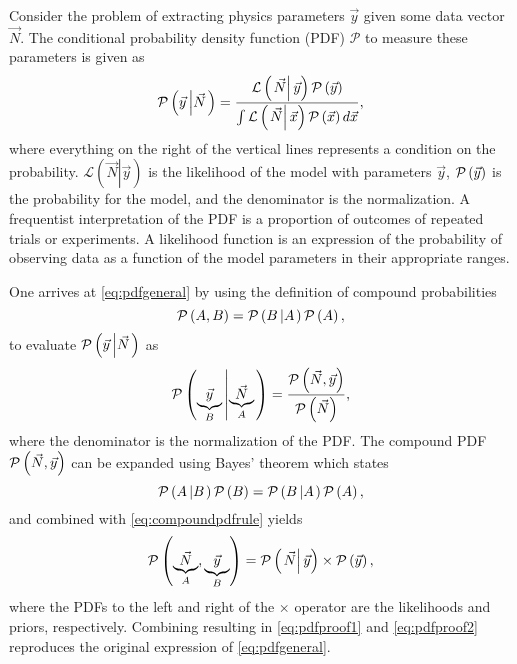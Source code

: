 Consider the problem of extracting physics parameters $\vec{y}$ given
some data vector $\vec{N}$. The conditional probability density function
(PDF) $\mathcal{P}$ to measure these parameters is given as
\begin{equation}
\mathcal{P}\left(\vec{y}\left|\vec{N}\right.\right)=\frac{\mathcal{L}\left(\left.\vec{N}\right|\vec{y}\right)\mathcal{P}\left(\vec{y}\right)}{\int\mathcal{L}\left(\left.\vec{N}\right|\vec{x}\right)\mathcal{P}\left(\vec{x}\right)d\vec{x}},\label{eq:pdfgeneral}
\end{equation}
where everything on the right of the vertical lines represents a condition
on the probability. $\mathcal{L}\left(\left.\vec{N}\right|\vec{y}\right)$
is the likelihood of the model with parameters $\vec{y}$, $\mathcal{P}\left(\vec{y}\right)$
is the probability for the model, and the denominator is the normalization.
A frequentist interpretation of the PDF is a proportion of outcomes
of repeated trials or experiments. A likelihood function is an expression
of the probability of observing data as a function of the model parameters
in their appropriate ranges.

One arrives at \eqref{eq:pdfgeneral} by using the definition of compound
probabilities
\begin{equation}
\mathcal{P}\left(A,B\right)=\mathcal{P}\left(B\left|A\right.\right)\mathcal{P}\left(A\right),\label{eq:compoundpdfrule}
\end{equation}
to evaluate $\mathcal{P}\left(\vec{y}\left|\vec{N}\right.\right)$ as
\begin{equation}
\mathcal{P}\left(\underset{B}{\underbrace{\vec{y}}}\left|\underset{A}{\underbrace{\vec{N}}}\right.\right)=\frac{\mathcal{P}\left(\vec{N},\vec{y}\right)}{\mathcal{P}\left(\vec{N}\right)},\label{eq:pdfproof1}
\end{equation}
where the denominator is the normalization of the PDF. The compound
PDF $\mathcal{P}\left(\vec{N},\vec{y}\right)$ can be expanded using Bayes' theorem
which states
\begin{equation}
\mathcal{P}\left(A\left|B\right.\right)\mathcal{P}\left(B\right)=\mathcal{P}\left(B\left|A\right.\right)\mathcal{P}\left(A\right),\label{eq:bayestheorem}
\end{equation}
and combined with \eqref{eq:compoundpdfrule} yields
\begin{equation}
\mathcal{P}\left(\underset{A}{\underbrace{\vec{N}}},\underset{B}{\underbrace{\vec{y}}}\right)=\mathcal{P}\left(\left.\vec{N}\right|\vec{y}\right)\times\mathcal{P}\left(\vec{y}\right),\label{eq:pdfproof2}
\end{equation}
where the PDFs to the left and right of the $\times$ operator are
the likelihoods and priors, respectively. Combining resulting in \eqref{eq:pdfproof1}
and \eqref{eq:pdfproof2} reproduces the original expression of \eqref{eq:pdfgeneral}.


